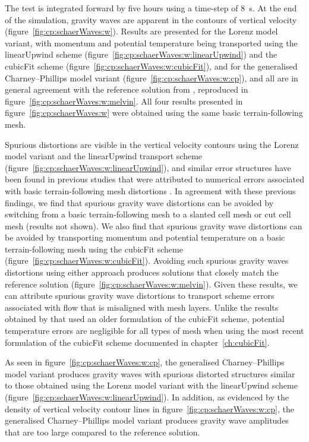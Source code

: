The test is integrated forward by five hours using a time-step of \SI{8}{\second}.  At the end of the simulation, gravity waves are apparent in the contours of vertical velocity (figure~\ref{fig:cp:schaerWaves:w}).
Results are presented for the Lorenz model variant, with momentum and potential temperature being transported using the linearUpwind scheme (figure~\ref{fig:cp:schaerWaves:w:linearUpwind}) and the cubicFit scheme (figure~\ref{fig:cp:schaerWaves:w:cubicFit}), and for the generalised Charney--Phillips model variant (figure~\ref{fig:cp:schaerWaves:w:cp}), and all are in general agreement with the reference solution from \citet{melvin2010}, reproduced in figure~\ref{fig:cp:schaerWaves:w:melvin}.
All four results presented in figure~\ref{fig:cp:schaerWaves:w} were obtained using the same basic terrain-following mesh.

Spurious distortions are visible in the vertical velocity contours using the Lorenz model variant and the linearUpwind transport scheme (figure~\ref{fig:cp:schaerWaves:w:linearUpwind}), and similar error structures have been found in previous studies that were attributed to numerical errors associated with basic terrain-following mesh distortions \citep{schaer2002,klemp2003}.
In agreement with these previous findings, we find that spurious gravity wave distortions can be avoided by switching from a basic terrain-following mesh to a slanted cell mesh or cut cell mesh (results not shown).
We also find that spurious gravity wave distortions can be avoided by transporting momentum and potential temperature on a basic terrain-following mesh using the cubicFit scheme (figure~\ref{fig:cp:schaerWaves:w:cubicFit}).
Avoiding such spurious gravity waves distortions using either approach produces solutions that closely match the reference solution (figure~\ref{fig:cp:schaerWaves:w:melvin}).
Given these results, we can attribute spurious gravity wave distortions to transport scheme errors associated with flow that is misaligned with mesh layers.
Unlike the results obtained by \citet{shaw-weller2016} that used an older formulation of the cubicFit scheme, potential temperature errors are negligible for all types of mesh when using the most recent formulation of the cubicFit scheme documented in chapter~\ref{ch:cubicFit}.

As seen in figure~\ref{fig:cp:schaerWaves:w:cp}, the generalised Charney--Phillips model variant produces gravity waves with spurious distorted structures similar to those obtained using the Lorenz model variant with the linearUpwind scheme (figure~\ref{fig:cp:schaerWaves:w:linearUpwind}).
In addition, as evidenced by the density of vertical velocity contour lines in figure~\ref{fig:cp:schaerWaves:w:cp}, the generalised Charney--Phillips model variant produces gravity wave amplitudes that are too large compared to the reference solution.

